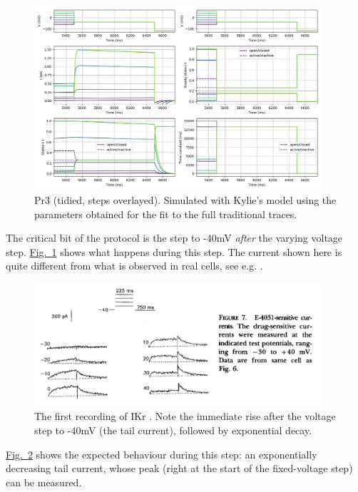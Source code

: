 \documentclass[preprint,authoryear,10pt]{elsarticle}
\newcommand\Fig[2][]{\hyperref[fig:#2]{Fig.~\ref*{fig:#2}\ifstrempty{#1}{}{.#1}}}
\begin{document}
\begin{figure}[H]
\centerline{
\includegraphics[width=0.95\textwidth]{fig/pr3-modified-folded}
}
\caption{%
Pr3 (tidied, steps overlayed). Simulated with Kylie's model using the
parameters obtained for the fit to the full traditional traces.
}
\label{fig:analysis-pr3-folded}
\end{figure}

The critical bit of the protocol is the step to -40mV \emph{after} the varying
 voltage step.
\Fig{analysis-pr3-folded} shows what happens during this step.
The current shown here is quite different from what is observed in real cells,
 see e.g. \citet{Sanguinetti1990IKIsIKrAndIKs}.

\begin{figure}[H]
\centerline{
\includegraphics[width=0.95\textwidth]{fig/sanguinetti-1990-ikr-tail}
}
\caption{%
The first recording of IKr \citep{Sanguinetti1990IKIsIKrAndIKs}.
Note the immediate rise after the voltage step to -40mV (the tail current),
followed by exponential decay.
}
\label{fig:sanguinetti}
\end{figure}

\Fig{sanguinetti} shows the expected behaviour during this step: an
exponentially decreasing tail current, whose peak (right at the start of the
fixed-voltage step) can be measured.
\end{document}
